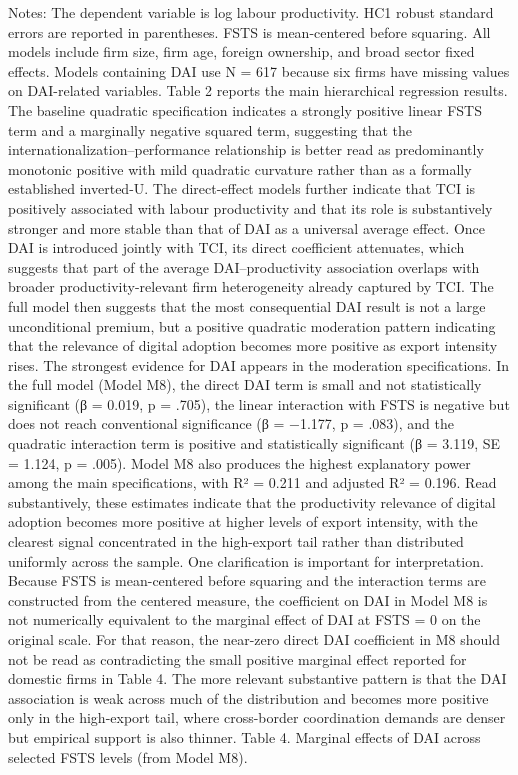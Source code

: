\documentclass[
  12pt,a4paper]{article}
\begin{document}
Notes: The dependent variable is log labour productivity. HC1 robust
standard errors are reported in parentheses. FSTS is mean-centered
before squaring. All models include firm size, firm age, foreign
ownership, and broad sector fixed effects. Models containing DAI use N =
617 because six firms have missing values on DAI-related variables.
Table 2 reports the main hierarchical regression results. The baseline
quadratic specification indicates a strongly positive linear FSTS term
and a marginally negative squared term, suggesting that the
internationalization--performance relationship is better read as
predominantly monotonic positive with mild quadratic curvature rather
than as a formally established inverted-U. The direct-effect models
further indicate that TCI is positively associated with labour
productivity and that its role is substantively stronger and more stable
than that of DAI as a universal average effect. Once DAI is introduced
jointly with TCI, its direct coefficient attenuates, which suggests that
part of the average DAI--productivity association overlaps with broader
productivity-relevant firm heterogeneity already captured by TCI. The
full model then suggests that the most consequential DAI result is not a
large unconditional premium, but a positive quadratic moderation pattern
indicating that the relevance of digital adoption becomes more positive
as export intensity rises. The strongest evidence for DAI appears in the
moderation specifications. In the full model (Model M8), the direct DAI
term is small and not statistically significant (β = 0.019, p = .705),
the linear interaction with FSTS is negative but does not reach
conventional significance (β = −1.177, p = .083), and the quadratic
interaction term is positive and statistically significant (β = 3.119,
SE = 1.124, p = .005). Model M8 also produces the highest explanatory
power among the main specifications, with R² = 0.211 and adjusted R² =
0.196. Read substantively, these estimates indicate that the
productivity relevance of digital adoption becomes more positive at
higher levels of export intensity, with the clearest signal concentrated
in the high-export tail rather than distributed uniformly across the
sample. One clarification is important for interpretation. Because FSTS
is mean-centered before squaring and the interaction terms are
constructed from the centered measure, the coefficient on DAI in Model
M8 is not numerically equivalent to the marginal effect of DAI at FSTS =
0 on the original scale. For that reason, the near-zero direct DAI
coefficient in M8 should not be read as contradicting the small positive
marginal effect reported for domestic firms in Table 4. The more
relevant substantive pattern is that the DAI association is weak across
much of the distribution and becomes more positive only in the
high-export tail, where cross-border coordination demands are denser but
empirical support is also thinner. Table 4. Marginal effects of DAI
across selected FSTS levels (from Model M8).
\end{document}

